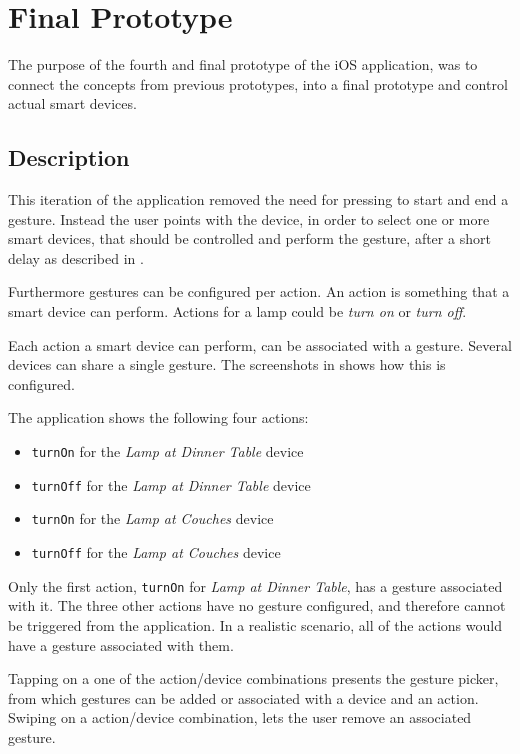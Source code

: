 \section{Final Prototype}
\label{sec:implementation:prototypes:prototype4}
The purpose of the fourth and final prototype of the iOS application, 
was to connect the concepts from previous prototypes, 
into a final prototype and control actual smart devices.

\subsection{Description}
This iteration of the application removed the need for pressing to start and end a gesture. 
Instead the user points with the device, 
in order to select one or more smart devices, 
that should be controlled and perform the gesture, 
after a short delay as described in .

Furthermore gestures can be configured per action.
An action is something that a smart device can perform. Actions for a lamp could be \textit{turn on} or \textit{turn off}.

Each action a smart device can perform, 
can be associated with a gesture. 
Several devices can share a single gesture. 
The screenshots in  shows how this is configured.

The application shows the following four actions:
\begin{itemize}
\item \texttt{turnOn} for the \emph{Lamp at Dinner Table} device
\item \texttt{turnOff} for the \emph{Lamp at Dinner Table} device
\item \texttt{turnOn} for the \emph{Lamp at Couches} device
\item \texttt{turnOff} for the \emph{Lamp at Couches} device
\end{itemize}

Only the first action, 
\texttt{turnOn} for \emph{Lamp at Dinner Table}, 
has a gesture associated with it. 
The three other actions have no gesture configured, 
and therefore cannot be triggered from the application.
In a realistic scenario, all of the actions would have a gesture associated with them.

Tapping on a one of the action/device combinations presents the gesture picker, 
from which gestures can be added or associated with a device and an action. 
Swiping on a action/device combination, 
lets the user remove an associated gesture.


